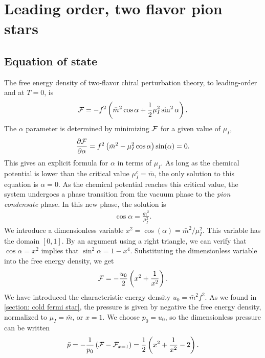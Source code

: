 \section{Leading order, two flavor pion stars}


\subsection{Equation of state}
The free energy density of two-flavor chiral perturbation theory, to leading-order and at $T = 0$, is
%
\begin{equation}
    \mathcal{F} = - f^2 \left(\bar m^2 \cos \alpha + \frac{1}{2} \mu_I^2 \sin^2 \alpha\right).
\end{equation}
%
The $\alpha$ parameter is determined by minimizing $\mathcal{F}$ for a given value of $\mu_I$,
%
\begin{equation}
    \pdv{\mathcal{F}}{\alpha} = f^2 \left(\bar m^2 - \mu_I^2 \cos \alpha\right) \sin(\alpha) = 0.
\end{equation}
%
This gives an explicit formula for $\alpha$ in terms of $\mu_I$.
As long as the chemical potential is lower than the critical value $\mu_I^c = \bar m$, the only solution to this equation is $\alpha = 0$.
As the chemical potential reaches this critical value, the system undergoes a phase transition from the vacuum phase to the \emph{pion condensate} phase.
In this new phase, the solution is
%
\begin{align}
    \label{alpha as function of mu lowest order}
    \cos \alpha = \frac{\bar m^2}{\mu_I^2}.
\end{align}
%
We introduce a dimensionless variable $x^2 = \cos(\alpha) = \bar m^2 / \mu_I^2$.
This variable has the domain $[0, 1]$.
By an argument using a right triangle, we can verify that $\cos \alpha = x^2$ implies that $\sin^2 \alpha = 1 - x^4$.
Substituting the dimensionless variable into the free energy density, we get 
%
\begin{equation}
    \mathcal{F} = - \frac{u_0}{2} \left( x^2 + \frac{1}{x^2} \right).
\end{equation}
%
We have introduced the characteristic energy density $u_0 = \bar m^2 f^2$.
As we found in \autoref{section: cold fermi star}, the pressure is given by negative the free energy density, normalized to $\mu_I = \bar m$, or $x = 1$.
We choose $p_0 = u_0$, so the dimensionless pressure can be written
%
\begin{equation}
    \label{pressure leading order chpt}
    \tilde p = -\frac{1}{p_0} \left(\mathcal{F} - \mathcal{F}_{x=1}\right) 
    = \frac{1}{2} \left( x^2 + \frac{1}{x^2} - 2 \right).
\end{equation}
